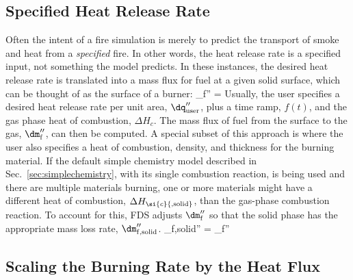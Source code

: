 \subsection{Specified Heat Release Rate}

Often the intent of a fire simulation is merely to predict the transport of smoke and heat from a {\em specified} fire. In other words, the heat release rate is a specified input, not something the model predicts. In these instances, the desired heat release rate is translated into a mass flux for fuel at a given solid surface, which can be thought of as the surface of a burner:
\be
   \dm_{\rm f}'' = 
\ee
Usually, the user specifies a desired heat release rate per unit area, $\dq_{\rm user}''$, plus a time ramp, $f(t)$, and the gas phase heat of combustion, $\Delta H_{\si{c}}$. The mass flux of fuel from the surface to the gas, $\dm_{\rm f}''$, can then be computed. A special subset of this approach is where the user also specifies a heat of combustion, density, and thickness for the burning material. If the default simple chemistry model described in Sec.~\ref{sec:simplechemistry}, with its single combustion reaction, is being used and there are multiple materials burning, one or more materials might have a different heat of combustion, $\Delta H_{\si{c}{\rm ,solid}}$, than the gas-phase combustion reaction. To account for this, FDS adjusts $\dm_{\rm f}''$ so that the solid phase has the appropriate mass loss rate, $\dm_{\rm f,solid}''$.
\be
\dm_{\rm f,solid}'' = \dm_{\rm f}'' 
\ee

\subsection{Scaling the Burning Rate by the Heat Flux}

